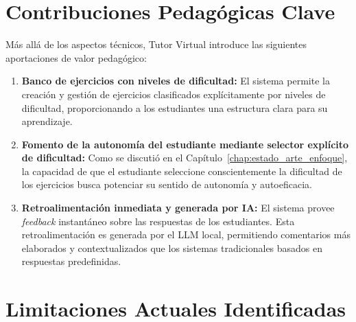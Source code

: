 \section{Contribuciones Pedagógicas Clave}
\label{sec:contribuciones_pedagogicas}

Más allá de los aspectos técnicos, Tutor Virtual introduce las siguientes aportaciones de valor pedagógico:
\begin{enumerate}[leftmargin=*]
  \item \textbf{Banco de ejercicios con niveles de dificultad:} El sistema permite la creación y gestión de ejercicios clasificados explícitamente por niveles de dificultad, proporcionando a los estudiantes una estructura clara para su aprendizaje.
  \item \textbf{Fomento de la autonomía del estudiante mediante selector explícito de dificultad:} Como se discutió en el Capítulo~\ref{chap:estado_arte_enfoque}, la capacidad de que el estudiante seleccione conscientemente la dificultad de los ejercicios busca potenciar su sentido de autonomía y autoeficacia.
  \item \textbf{Retroalimentación inmediata y generada por IA:} El sistema provee \emph{feedback} instantáneo sobre las respuestas de los estudiantes. Esta retroalimentación es generada por el LLM local, permitiendo comentarios más elaborados y contextualizados que los sistemas tradicionales basados en respuestas predefinidas.
\end{enumerate}


\section{Limitaciones Actuales Identificadas}
\label{sec:limitaciones_actuales_aportaciones}

